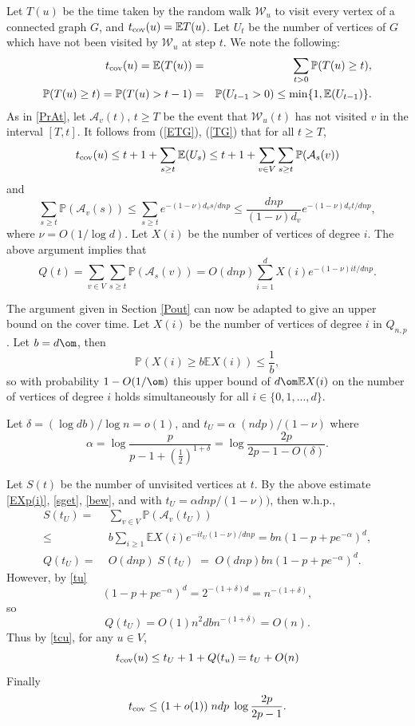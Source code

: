 \documentclass[12pt]{article}
\newcommand{\gap}[1]{\mbox{\hspace{#1 in}}}
\def\a{\alpha} \def\b{\beta} \def\d{\delta} \def\D{\Delta}
\newcommand{\brac}[1]{\left(#1\right)}
\newcommand{\sfrac}[2]{\frac{\scriptstyle #1}{\scriptstyle #2}}
\def\half{\sfrac{1}{2}}
\def\E{\mathbb{E}}
\def\Pr{\mathbb{P}}
\def\cW{{\mathcal W}}
\def\tc{t_{\rm cov}}
\def\mcA{\mathcal{A}}
\begin{document}
Let $T(u)$ be the time taken by the random walk $\cW_u$
to visit every vertex of a connected graph
$G$, and $\tc(u)=\E T(u)$. Let $U_t$ be
the number of vertices of $G$ which have not been visited by
$\cW_u$ at step $t$.
We note the following:
\begin{eqnarray}
\gap{.4}\tc(u)=\E(T(u))&=& \sum_{t > 0} \Pr(T(u) \ge t), \label{ETG} \\
\label{TG}
\Pr(T(u)\geq t)=\Pr(T(u) > t-1)&=&\Pr(U_{t-1}>0)\le \min\{1,\E(U_{t-1})\}.
\end{eqnarray}
As in  \eqref{PrAt}, let $\mcA_v(t),\,t\geq T$ be the event that $\cW_u(t)$ has
not visited $v$ in the interval $[T,t]$.
It follows from (\ref{ETG}), (\ref{TG}) that for all $t\geq T$,
\begin{equation}\label{tcu}
\tc(u) \le t+1+ \sum_{s \ge t} \E(U_{s})\le t+1 +\sum_{v\in V} \sum_{s \ge t}\Pr(\mcA_s(v))
\end{equation}
and
\begin{equation}\label{shed1}
\sum_{s \ge t}\Pr(\mathcal{A}_v(s)) \le \sum_{s \ge t} e^{-(1-\nu)d_v s/dnp} \le \frac{dnp}{(1-\nu)d_v}e^{-(1-\nu)d_v t/dnp},
\end{equation}
where $\nu=O(1/\log d)$.
Let $X(i)$ be the number of vertices of degree $i$. The above argument implies that
\begin{equation}\label{sget}
Q(t)=\sum_{v\in V}\sum_{s \ge t} \Pr(\mathcal{A}_s(v)) =
O\brac{dnp}\sum_{i=1}^d{X(i)} e^{- (1-\nu)it/dnp}.
\end{equation}





The argument given in Section \ref{Pout} can  now be adapted to give an upper bound on the cover time.
Let $X(i)$ be the number of vertices of degree $i$ in $Q_{n,p}$.
Let $b=d \om$, then
\begin{equation}\label{bew}
\Pr(X(i) \ge b \E X(i)) \le \frac 1b,
\end{equation}
so with probability $1-O(1/\om)$ this  upper bound of $d \om \E X(i)$ on the number of vertices of
degree $i$ holds simultaneously  for all $i \in \{0,1,...,d\}$.

Let $\d= (\log db)/\log n=o(1)$, and $t_U= \a \;(ndp)/(1-\nu)$ where
\begin{equation}\label{tu}
\a=
 \log \frac{p}{p-1+ \brac{\half}^{1+\d}} = \log \frac{2p}{2p-1 -O(\d)}.
\end{equation}


Let $S(t)$ be the number of unvisited vertices at $t$. By the above estimate  \eqref{EXp(i)}, \eqref{sget}, \eqref{bew}, and with $t_U=\a dnp/(1-\nu))$, then w.h.p.,
\begin{align}\label{SQ}
S(t_U)=&\;\sum_{v \in V} \Pr(\mathcal{A}_v(t_U))\\
\le &\;b \sum_{i \ge 1} \E X(i) e^{-it_U(1-\nu)/dnp} =  bn (1-p+pe^{-\a})^d,\\
Q(t_U)=&\; O(dnp)\; S(t_U)\;= \;O(dnp) bn (1-p+pe^{-\a})^d.
\end{align}
However, by \eqref{tu}
\[
(1-p+pe^{-\a})^d=  2^{-(1+\d)d}=n^{-(1+\d)},
\]
so
\[
Q(t_U)=O(1) n^2 db n^{-(1+\d)}=O(n).
\]
Thus by \eqref{tcu}, for any $u \in V$,
\[
\tc(u)\le t_U+1+Q(t_u)=t_U+O(n)
\]
Finally
\[
\tc \le (1+o(1))\; ndp \;\log \frac{2p}{2p-1}.
\]
\end{document}
